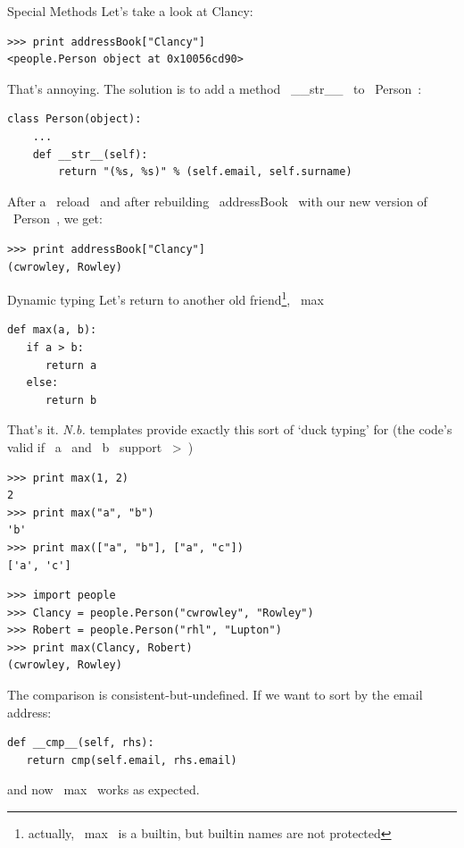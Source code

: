 \documentclass[10pt, t]{beamer}
\let\verb=\codeDelimTwiddles
\begin{document}
\begin{frame}[fragile,label=sec-2-21]{Special Methods}
 Let's take a look at Clancy:
\lstset{language=Python,label= ,caption= ,numbers=none}
\begin{lstlisting}
>>> print addressBook["Clancy"]
<people.Person object at 0x10056cd90>
\end{lstlisting}
\pause
That's annoying.  The solution is to add a method \verb~\_\_str\_\_~ to \verb~Person~:
\lstset{language=Python,label= ,caption= ,numbers=none}
\begin{lstlisting}
class Person(object):
    ...
    def __str__(self):
        return "(%s, %s)" % (self.email, self.surname)
\end{lstlisting}
\pause
After a \verb~reload~ and after rebuilding \verb~addressBook~ with our new version of \verb~Person~, we get:
\lstset{language=Python,label= ,caption= ,numbers=none}
\begin{lstlisting}
>>> print addressBook["Clancy"]
(cwrowley, Rowley)
\end{lstlisting}
\end{frame}

\begin{frame}[fragile,label=sec-2-22]{Dynamic typing}
 \vspace*{-1mm}
Let's return to another old friend\footnote{actually, \verb~max~ is a builtin, but builtin names are not protected}, \verb~max~
\pause
\lstset{language=Python,label= ,caption= ,numbers=none}
\begin{lstlisting}
def max(a, b):
   if a > b:
      return a
   else:
      return b
\end{lstlisting}
\pause
That's it.
\pause
\emph{N.b.} templates provide exactly this sort of `duck typing' for \CPP (the code's valid if \verb~a~ and \verb~b~
support \verb~>~)

\pause
\lstset{language=Python,label= ,caption= ,numbers=none}
\begin{lstlisting}
>>> print max(1, 2)
2
>>> print max("a", "b")
'b'
>>> print max(["a", "b"], ["a", "c"])
['a', 'c']
\end{lstlisting}
\pause
\lstset{language=Python,label= ,caption= ,numbers=none}
\begin{lstlisting}
>>> import people
>>> Clancy = people.Person("cwrowley", "Rowley")
>>> Robert = people.Person("rhl", "Lupton")
>>> print max(Clancy, Robert)
(cwrowley, Rowley)
\end{lstlisting}
\pause The comparison is consistent-but-undefined.  If we want to sort by the email address:
\lstset{language=Python,label= ,caption= ,numbers=none}
\begin{lstlisting}
def __cmp__(self, rhs):
   return cmp(self.email, rhs.email)
\end{lstlisting}
and now \verb~max~ works as expected.
\end{frame}
\end{document}
